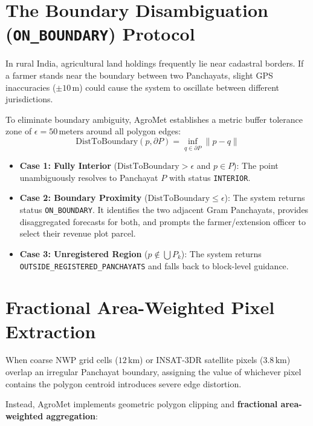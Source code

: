 \documentclass[11pt,a4paper,oneside]{report}
\begin{document}
\section{The Boundary Disambiguation (\texttt{ON\_BOUNDARY}) Protocol}
In rural India, agricultural land holdings frequently lie near cadastral borders. If a farmer stands near the boundary between two Panchayats, slight GPS inaccuracies ($\pm 10\,\text{m}$) could cause the system to oscillate between different jurisdictions.

\begin{innovationbox}
To eliminate boundary ambiguity, AgroMet establishes a metric buffer tolerance zone of $\epsilon = 50\,\text{meters}$ around all polygon edges:
\begin{equation}
\text{DistToBoundary}(p, \partial P) = \inf_{q \in \partial P} \|p - q\|
\end{equation}
\begin{itemize}
    \item \textbf{Case 1: Fully Interior} ($\text{DistToBoundary} > \epsilon$ and $p \in P$): The point unambiguously resolves to Panchayat $P$ with status \texttt{INTERIOR}.
    \item \textbf{Case 2: Boundary Proximity} ($\text{DistToBoundary} \le \epsilon$): The system returns status \texttt{ON\_BOUNDARY}. It identifies the two adjacent Gram Panchayats, provides disaggregated forecasts for both, and prompts the farmer/extension officer to select their revenue plot parcel.
    \item \textbf{Case 3: Unregistered Region} ($p \notin \bigcup P_k$): The system returns \texttt{OUTSIDE\_REGISTERED\_PANCHAYATS} and falls back to block-level guidance.
\end{itemize}
\end{innovationbox}

\section{Fractional Area-Weighted Pixel Extraction}
When coarse NWP grid cells ($12\,\text{km}$) or INSAT-3DR satellite pixels ($3.8\,\text{km}$) overlap an irregular Panchayat boundary, assigning the value of whichever pixel contains the polygon centroid introduces severe edge distortion. 

Instead, AgroMet implements geometric polygon clipping and \textbf{fractional area-weighted aggregation}:
\end{document}
